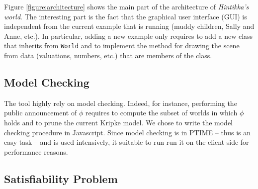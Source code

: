 \documentclass{article}
\begin{document}
Figure \ref{figure:architecture} shows the main part of the architecture of \emph{Hintikka's world}. The interesting part is the fact that the graphical user interface (GUI) is independent from the current example that is running (muddy children, Sally and Anne, etc.). In particular, adding a new example only requires to add a new class that inherits from \texttt{World} and to implement the method for drawing the scene from data (valuations, numbers, etc.) that are members of the class.

\subsection{Model Checking}

The tool highly rely on model checking. Indeed, for instance, performing the public announcement of $\phi$ requires to compute the subset of worlds in which $\phi$ holds and to prune the current Kripke model. We chose to write the  model checking procedure in Javascript. Since model checking is in PTIME -- thus is an easy task -- and is used intensively, it suitable to run run it on the client-side  for performance reasons.

\subsection{Satisfiability Problem}
\end{document}
